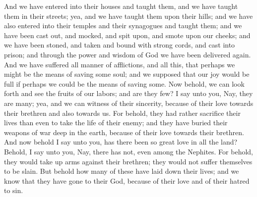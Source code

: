 And we have entered into their houses and taught them, and we have taught them in their streets; yea, and we have taught them upon their hills; and we have also entered into their temples and their synagogues and taught them; and we have been cast out, and mocked, and spit upon, and smote upon our cheeks; and we have been stoned, and taken and bound with strong cords, and cast into prison; and through the power and wisdom of God we have been delivered again.
\bverse \iffalse And we have suffered all manner of afflictions, and all this, that perhaps we might be the means of saving some soul; and we supposed that our joy would be full if perhaps we could be the means of saving some. \fi
And we have suffered all manner of afflictions, and all this, that perhaps we might be the means of saving some soul; and we supposed that our joy would be full if perhaps we could be the means of saving some.
\bverse \iffalse Now behold, we can look forth and see the fruits of our labors; and are they few? I say unto you, Nay, they are many; yea, and we can witness of their sincerity, because of their love towards their brethren and also towards us. \fi
Now behold, we can look forth and see the fruits of our labors; and are they few? I say unto you, Nay, they are many; yea, and we can witness of their sincerity, because of their love towards their brethren and also towards us.
\bverse \iffalse For behold, they had rather sacrifice their lives than even to take the life of their enemy; and they have buried their weapons of war deep in the earth, because of their love towards their brethren. \fi
For behold, they had rather sacrifice their lives than even to take the life of their enemy; and they have buried their weapons of war deep in the earth, because of their love towards their brethren.
\bverse \iffalse And now behold I say unto you, has there been so great love in all the land? Behold, I say unto you, Nay, there has not, even among the Nephites. \fi
And now behold I say unto you, has there been so great love in all the land? Behold, I say unto you, Nay, there has not, even among the Nephites.
\bverse \iffalse For behold, they would take up arms against their brethren; they would not suffer themselves to be slain. But behold how many of these have laid down their lives; and we know that they have gone to their God, because of their love and of their hatred to sin. \fi
For behold, they would take up arms against their brethren; they would not suffer themselves to be slain. But behold how many of these have laid down their lives; and we know that they have gone to their God, because of their love and of their hatred to sin.

